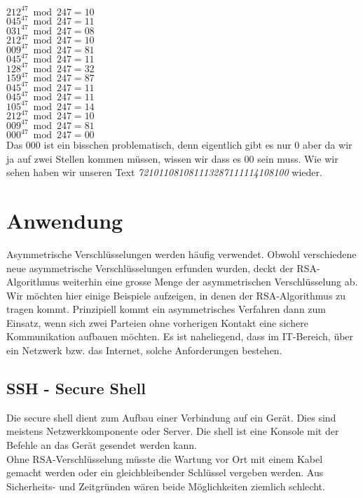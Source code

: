 $ 212^{47} \bmod 247 = 10 $ \\
$ 045^{47} \bmod 247 = 11 $ \\
$ 031^{47} \bmod 247 = 08 $ \\
$ 212^{47} \bmod 247 = 10 $ \\
$ 009^{47} \bmod 247 = 81 $ \\
$ 045^{47} \bmod 247 = 11 $ \\
$ 128^{47} \bmod 247 = 32 $ \\
$ 159^{47} \bmod 247 = 87 $ \\
$ 045^{47} \bmod 247 = 11 $ \\
$ 045^{47} \bmod 247 = 11 $ \\
$ 105^{47} \bmod 247 = 14 $ \\
$ 212^{47} \bmod 247 = 10 $ \\
$ 009^{47} \bmod 247 = 81 $ \\
$ 000^{47} \bmod 247 = 00 $ \\
Das 000 ist ein bisschen problematisch, denn eigentlich gibt es nur 0 aber da wir ja auf zwei Stellen kommen müssen, wissen wir dass es 00 sein muss. Wie wir sehen haben wir unseren Text \textit{721011081081113287111114108100}  wieder.


\section{Anwendung}
Asymmetrische Verschlüsselungen werden häufig verwendet.  Obwohl verschiedene neue asymmetrische Verschlüsselungen erfunden wurden, deckt der RSA-Algorithmus weiterhin eine grosse Menge der asymmetrischen Verschlüsselung ab.\\
Wir möchten hier einige Beispiele aufzeigen, in denen der RSA-Algorithmus zu tragen kommt. Prinzipiell kommt ein asymmetrisches Verfahren dann zum Einsatz, wenn sich zwei Parteien ohne vorherigen Kontakt eine sichere Kommunikation aufbauen möchten. Es ist naheliegend, dass im IT-Bereich, über ein Netzwerk bzw. das Internet, solche Anforderungen bestehen.

\subsection{SSH - Secure Shell}
Die secure shell dient zum Aufbau einer Verbindung auf ein Gerät. Dies sind meistens Netzwerkkomponente oder Server. Die shell ist eine Konsole mit der Befehle an das Gerät gesendet werden kann.\\
Ohne RSA-Verschlüsselung müsste die Wartung vor Ort mit einem Kabel gemacht werden oder ein gleichbleibender Schlüssel vergeben werden. Aus Sicherheits- und Zeitgründen wären beide Möglichkeiten ziemlich schlecht.

